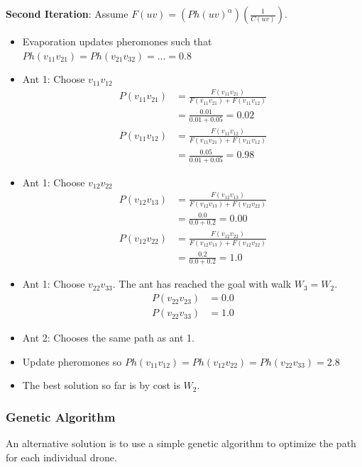 \documentclass[conference]{IEEEtran}
\begin{document}
\textbf{Second Iteration}:
Assume $F(uv) = (Ph(uv)^\alpha)(\frac{1}{C(uv)})$.
\begin{itemize}
\item Evaporation updates pheromones such that $Ph(v_{11}v_{21}) = Ph(v_{21}v_{32}) = ... = 0.8$

\item Ant 1: Choose $v_{11}v_{12}$
\begin{align*}
P(v_{11}v_{21}) &= \frac{F(v_{11}v_{21})}{F(v_{11}v_{21}) + F(v_{11}v_{12})} \\
&= \frac{0.01}{0.01 + 0.05} = 0.02 \\
P(v_{11}v_{12}) &= \frac{F(v_{11}v_{12})}{F(v_{11}v_{21}) + F(v_{11}v_{12})} \\
&= \frac{0.05}{0.01 + 0.05} = 0.98
\end{align*}

\item Ant 1: Choose $v_{12}v_{22}$
\begin{align*}
P(v_{12}v_{13}) &= \frac{F(v_{12}v_{13})}{F(v_{12}v_{13}) + F(v_{12}v_{22})} \\
&= \frac{0.0}{0.0 + 0.2} = 0.00 \\
P(v_{12}v_{22}) &= \frac{F(v_{12}v_{22})}{F(v_{12}v_{13}) + F(v_{12}v_{22})} \\
&= \frac{0.2}{0.0 + 0.2} = 1.0
\end{align*}

\item Ant 1: Choose $v_{22}v_{33}$. The ant has reached the goal with walk $W_3 = W_2$.
\begin{align*}
P(v_{22}v_{23}) &= 0.0 \\
P(v_{22}v_{33}) &= 1.0
\end{align*}

\item Ant 2: Chooses the same path as ant 1.

\item Update pheromones so $Ph(v_{11}v_{12}) = Ph(v_{12}v_{22}) = Ph(v_{22}v_{33}) = 2.8$

\item The best solution so far is by cost is $W_2$.

\end{itemize}

\subsubsection{Genetic Algorithm}
An alternative solution is to use a simple genetic algorithm to optimize the path for each individual drone.
\end{document}
